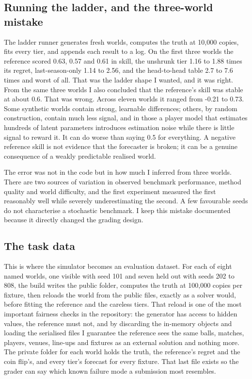 \documentclass[11pt,letterpaper]{article}
\begin{document}
\subsection{Running the ladder, and the three-world mistake}

The ladder runner generates fresh worlds, computes the truth at 10,000 copies, fits every tier, and appends each result to a log. On the first three worlds the reference scored 0.63, 0.57 and 0.61 in skill, the unshrunk tier 1.16 to 1.88 times its regret, last-season-only 1.14 to 2.56, and the head-to-head table 2.7 to 7.6 times and worst of all. That was the ladder shape I wanted, and it was right. From the same three worlds I also concluded that the reference's skill was stable at about 0.6. That was wrong. Across eleven worlds it ranged from -0.21 to 0.73. Some synthetic worlds contain strong, learnable differences; others, by random construction, contain much less signal, and in those a player model that estimates hundreds of latent parameters introduces estimation noise while there is little signal to reward it. It can do worse than saying 0.5 for everything. A negative reference skill is not evidence that the forecaster is broken; it can be a genuine consequence of a weakly predictable realised world.


The error was not in the code but in how much I inferred from three worlds. There are two sources of variation in observed benchmark performance, method quality and world difficulty, and the first experiment measured the first reasonably well while severely underestimating the second. A few favourable seeds do not characterise a stochastic benchmark. I keep this mistake documented because it directly changed the grading design.


\subsection{The task data}

This is where the simulator becomes an evaluation dataset. For each of eight named worlds, one visible with seed 101 and seven held out with seeds 202 to 808, the build writes the public folder, computes the truth at 100,000 copies per fixture, then reloads the world from the public files, exactly as a solver would, before fitting the reference and the careless tiers. That reload is one of the most important fairness checks in the repository: the generator has access to hidden values, the reference must not, and by discarding the in-memory objects and loading the serialised files I guarantee the reference sees the same balls, matches, players, venues, line-ups and fixtures as an external solution and nothing more. The private folder for each world holds the truth, the reference's regret and the coin flip's, and every tier's forecast for every fixture. That last file exists so the grader can say which known failure mode a submission most resembles.
\end{document}
